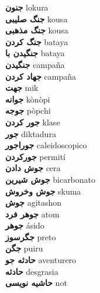 \textbf{ جنون  } lokura \\
\textbf{ جنگ صلیبی  } kousa \\
\textbf{ جنگ مذهبی  } kousa \\
\textbf{ جنگ کردن  } bataya \\
\textbf{ جنگیدن با  } bataya \\
\textbf{ جنگیدن  } campaña \\
\textbf{ جهاد کردن  } campaña \\
\textbf{ جهت  } mik \\
\textbf{ جوانه  } kònòpi \\
\textbf{ جوجه  } pòpchi \\
\textbf{ جور کردن  } klase \\
\textbf{ جور  } diktadura \\
\textbf{ جوراجور  } caleidoscopico \\
\textbf{ جورکردن  } permití \\
\textbf{ جوش دادن  } cera \\
\textbf{ جوش شیرین  } bicarbonato \\
\textbf{ جوش وخروش  } skuma \\
\textbf{ جوش  } agitashon \\
\textbf{ جوهر فرد  } atom \\
\textbf{ جوهر  } ásido \\
\textbf{ جگرسوز  } preto \\
\textbf{ جگن  } puiru \\
\textbf{ حادثه جو  } aventurero \\
\textbf{ حادثه  } desgrasia \\
\textbf{ حاشیه نویسی  } not \\
